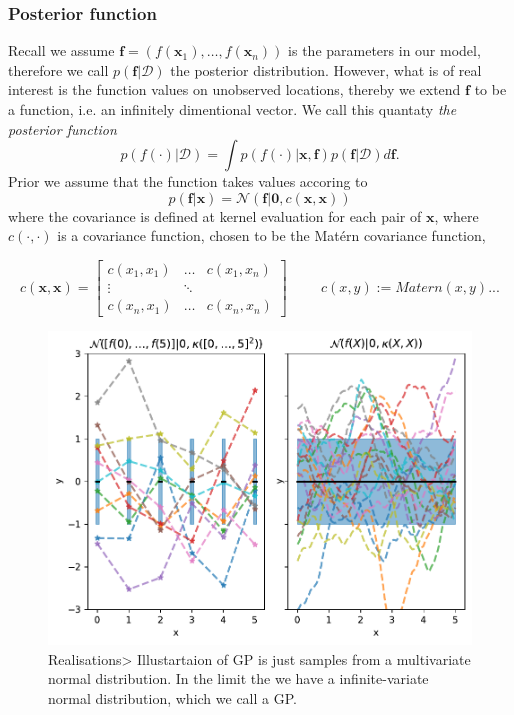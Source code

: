 \subsubsection*{Posterior function}
Recall we assume $\textbf{f} = (f(\textbf{x}_1), \dots, f(\textbf{x}_n))$ is the parameters in 
our model, therefore we call $p(\textbf{f}|\mathcal{D})$ the posterior distribution. However, 
what is of real interest is the function values on unobserved locations, thereby we 
extend $\textbf{f}$ to be a function, i.e. an infinitely dimentional vector. We call this 
quantaty \textit{the posterior function} 
\begin{equation}\label{posterior_function}
    p(f(\cdot)|\mathcal{D})= \int p(f(\cdot)|\textbf{x}, \textbf{f})p(\textbf{f}|\mathcal{D})d\textbf{f}.
\end{equation}
Prior we assume that the function takes values accoring to
$$p(\textbf{f}|\textbf{x}) = \mathcal{N}(\textbf{f}|\textbf{0}, c(\textbf{x}, \textbf{x}))$$ where
the covariance is defined at kernel evaluation for each pair of $\textbf{x}$, where $c(\cdot,
\cdot)$ is a covariance function, chosen to be the Matérn covariance function,

  $$c(\textbf{x}, \textbf{x}) = \begin{bmatrix}
    c(x_1,x_1) & \dots & c(x_1,x_n)\\
    \vdots& \ddots\\
    c(x_n,x_1) & \dots & c(x_n,x_n)
\end{bmatrix}\hspace{1cm} c(x, y) := Matern(x,y)...$$ 

\begin{figure}[h]
    \centering
    \includegraphics[width = \textwidth]{Pictures/GP_samples_mattern.pdf}
    \caption{Realisations> Illustartaion of GP is just samples from a multivariate normal distribution. In the
    limit the we have a infinite-variate normal distribution, which we call a GP.}
\end{figure}

